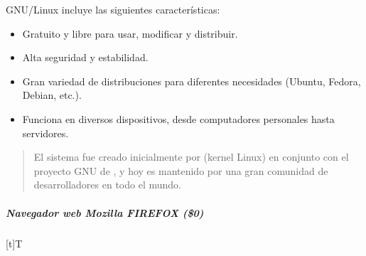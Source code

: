 \documentclass[letterpaper,10pt,spanish]{sphinxmanual}
\let\sphinxpxdimen\pdfpxdimen\else\newdimen\sphinxpxdimen
\begin{document}
\sphinxAtStartPar
GNU/Linux incluye las siguientes características:
\begin{itemize}
\item {} 
\sphinxAtStartPar
Gratuito y libre para usar, modificar y distribuir.

\item {} 
\sphinxAtStartPar
Alta seguridad y estabilidad.

\item {} 
\sphinxAtStartPar
Gran variedad de distribuciones para diferentes necesidades (Ubuntu, Fedora, Debian, etc.).

\item {} 
\sphinxAtStartPar
Funciona en diversos dispositivos, desde computadores personales hasta servidores.

\end{itemize}
\begin{quote}

\sphinxAtStartPar
El sistema fue creado inicialmente por  (kernel Linux) en conjunto con el proyecto GNU de , y hoy es mantenido por una gran comunidad de desarrolladores en todo el mundo.
\end{quote}


\subparagraph{Navegador web Mozilla FIREFOX (\$0)}
\label{\detokenize{cursos/ofimatica10/recursos/T02:navegador-web-mozilla-firefox-0}}

\begin{savenotes}\sphinxattablestart
\sphinxthistablewithglobalstyle
\centering
\begin{tabulary}{\linewidth}[t]{T}
\sphinxtoprule
\sphinxtableatstartofbodyhook

\begin{sphinxfigure-in-table}
\centering
\capstart
\noindent\sphinxincludegraphics[width=360\sphinxpxdimen]{{image042}.png}
\label{\detokenize{cursos/ofimatica10/recursos/T02:id36}}\end{sphinxfigure-in-table}\relax
\\
\sphinxbottomrule
\end{tabulary}
\sphinxtableafterendhook\par
\sphinxattableend\end{savenotes}
\end{document}
